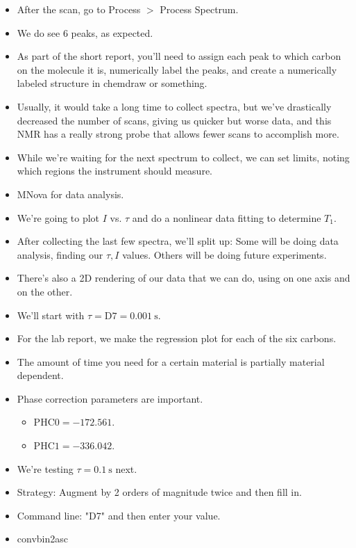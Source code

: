 \documentclass[../notes.tex]{subfiles}
\begin{document}
\begin{itemize}
    \item After the scan, go to Process $>$ Process Spectrum.
    \item We do see 6 peaks, as expected.
    \item As part of the short report, you'll need to assign each  peak to which carbon on the molecule it is, numerically label the peaks, and create a numerically labeled structure in chemdraw or something.
    \item Usually, it would take a long time to collect  spectra, but we've drastically decreased the number of scans, giving us quicker but worse data, and this NMR has a really strong probe that allows fewer scans to accomplish more.
    \item While we're waiting for the next spectrum to collect, we can set limits, noting which regions the instrument should measure.
    \item MNova for data analysis.
    \item We're going to plot $I$ vs. $\tau$ and do a nonlinear data fitting to determine $T_1$.
    \item After collecting the last few spectra, we'll split up: Some will be doing data analysis, finding our $\tau,I$ values. Others will be doing future experiments.
    \item There's also a 2D rendering of our data that we can do, using  on one axis and  on the other.
    \item We'll start with $\tau=\text{D7}=\SI{0.001}{\second}$.
    \item For the lab report, we make the regression plot for each of the six carbons.
    \item The amount of time you need for a certain material is partially material dependent.
    \item Phase correction parameters are important.
    \begin{itemize}
        \item $\text{PHC0}=-172.561$.
        \item $\text{PHC1}=-336.042$.
    \end{itemize}
    \item We're testing $\tau=\SI{0.1}{\second}$ next.
    \item Strategy: Augment by 2 orders of magnitude twice and then fill in.
    \item Command line: "D7" and then enter your value.
    \item convbin2asc
\end{itemize}
\end{document}
